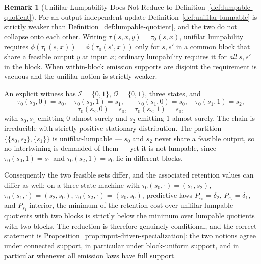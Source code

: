\documentclass[12pt]{article}
\theoremstyle{definition}
\newtheorem{remark}[theorem]{Remark}
\begin{document}
\begin{remark}[Unifilar Lumpability Does Not Reduce to
Definition~\ref{def:lumpable-quotient}]
\label{rem:unifilar-support-not-automatic}
For an output-independent update Definition~\ref{def:unifilar-lumpable} is
strictly weaker than Definition~\ref{def:lumpable-quotient}, and the two do not
collapse onto each other.  Writing
$\tau(s,x,y)=\tau_0(s,x)$, unifilar lumpability requires
$\phi(\tau_0(s,x))=\phi(\tau_0(s',x))$ only for $s,s'$ in a common block that
share a feasible output $y$ at input $x$; ordinary lumpability requires it for
\emph{all} $s,s'$ in the block.  When within-block emission supports are
disjoint the requirement is vacuous and the unifilar notion is strictly weaker.

An explicit witness has $\mathcal I=\{0,1\}$, $\mathcal O=\{0,1\}$, three
states, and
\[
\tau_0(s_0,0)=s_0,\quad \tau_0(s_0,1)=s_1,\qquad
\tau_0(s_1,0)=s_0,\quad \tau_0(s_1,1)=s_2,
\]
\[
\tau_0(s_2,0)=s_0,\quad \tau_0(s_2,1)=s_0,
\]
with $s_0,s_1$ emitting $0$ almost surely and $s_2$ emitting $1$ almost surely.
The chain is irreducible with strictly positive stationary distribution.  The
partition $\{\{s_0,s_2\},\{s_1\}\}$ is unifilar-lumpable --- $s_0$ and $s_2$
never share a feasible output, so no intertwining is demanded of them --- yet
it is not lumpable, since $\tau_0(s_0,1)=s_1$ and $\tau_0(s_2,1)=s_0$ lie in
different blocks.

Consequently the two feasible sets differ, and the associated retention values
can differ as well: on a three-state machine with
$\tau_0(s_0,\cdot)=(s_1,s_2)$, $\tau_0(s_1,\cdot)=(s_2,s_0)$,
$\tau_0(s_2,\cdot)=(s_0,s_0)$, predictive laws
$P_{s_0}=\delta_2$, $P_{s_2}=\delta_1$, and $P_{s_1}$ interior, the minimum of
the retention cost over unifilar-lumpable quotients with two blocks is strictly
below the minimum over lumpable quotients with two blocks.  The reduction is
therefore genuinely conditional, and the correct statement is
Proposition~\ref{prop:input-driven-specialization}: the two notions agree under
connected support, in particular under block-uniform support, and in particular
whenever all emission laws have full support.
\end{remark}
\end{document}
